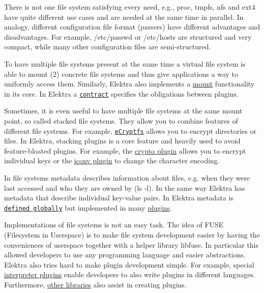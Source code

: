 There is not one file system satisfying every need, e.\+g., {\ttfamily proc}, {\ttfamily tmpfs}, {\ttfamily nfs} and {\ttfamily ext4} have quite different use cases and are needed at the same time in parallel. In analogy, different configuration file format (parsers) have different advantages and disadvantages. For example, {\ttfamily /etc/passwd} or {\ttfamily /etc/hosts} are structured and very compact, while many other configuration files are semi-\/structured.

To have multiple file systems present at the same time a virtual file system is able to mount (2) concrete file systems and thus give applications a way to uniformly access them. Similarly, Elektra also implements a \hyperlink{doc_help_elektra-mounting_md}{mount} functionality in its core. In Elektra a \href{/home/jenkins/workspace/libelektra-release/doc/CONTRACT.ini}{\tt contract} specifies the obligations between plugins.

Sometimes, it is even useful to have multiple file systems at the same mount point, so called {\ttfamily stacked} file systems. They allow you to combine features of different file systems. For example, \href{https://wiki.archlinux.org/index.php/ECryptfs}{\tt e\+Cryptfs} allows you to encrypt directories or files. In Elektra, stacking plugins is a core feature and heavily used to avoid feature-\/bloated plugins. For example, the \hyperlink{autotoc_md111_src_plugins_crypto_README_md}{crypto plugin} allows you to encrypt individual keys or the \hyperlink{autotoc_md282_src_plugins_iconv_README_md}{iconv plugin} to change the character encoding.

In file systems metadata describes information about files, e.\+g. when they were last accessed and who they are owned by ({\ttfamily ls -\/l}). In the same way Elektra has metadata that describe individual key-\/value pairs. In Elektra metadata is \href{/home/jenkins/workspace/libelektra-release/doc/METADATA.ini}{\tt defined globally} but implemented in many \hyperlink{src_plugins_README_md}{plugins}.

Implementations of file systems is not an easy task. The idea of F\+U\+SE (Filesystem in Userspace) is to make file system development easier by having the conveniences of userspace together with a helper library {\ttfamily libfuse}. In particular this allowed developers to use any programming language and easier abstractions. Elektra also tries hard to make plugin development simple. For example, special \hyperlink{src_plugins_README_md}{interpreter plugins} enable developers to also write plugins in different languages. Furthermore, \hyperlink{src_libs_README_md}{other libraries} also assist in creating plugins.

